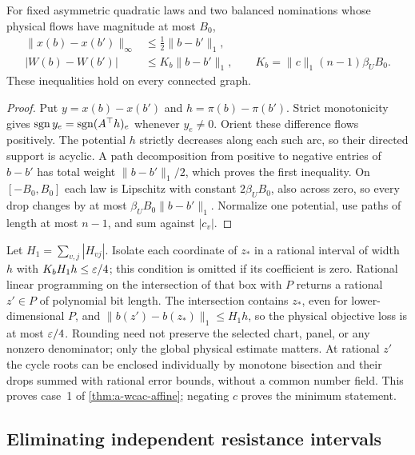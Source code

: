 \begin{lemma}
\label{lem:a-wcac-nomination-continuity}
For fixed asymmetric quadratic laws and two balanced nominations whose
physical flows have magnitude at most $B_0$,
\begin{align}
 \|x(b)-x(b')\|_\infty&\le\tfrac12\|b-b'\|_1,
 \label{eq:a-wcac-flow-nomination}\\
 |W(b)-W(b')|&\le K_b\|b-b'\|_1,
 \qquad K_b=\|c\|_1(n-1)\beta_U B_0.
 \label{eq:a-wcac-nomination-bound}
\end{align}
These inequalities hold on every connected graph.
\end{lemma}
\begin{proof}
Put $y=x(b)-x(b')$ and $h=\pi(b)-\pi(b')$. Strict monotonicity gives
$\operatorname{sgn} y_e=\operatorname{sgn}(A^\top h)_e$ whenever $y_e\ne0$. Orient these difference
flows positively. The potential $h$ strictly decreases along each such
arc, so their directed support is acyclic. A path decomposition from
positive to negative entries of $b-b'$ has total weight $\|b-b'\|_1/2$,
which proves the first inequality. On $[-B_0,B_0]$ each law is Lipschitz
with constant $2\beta_U B_0$, also across zero, so every drop changes by
at most $\beta_U B_0\|b-b'\|_1$. Normalize one potential, use paths of
length at most $n-1$, and sum against $|c_v|$.
\end{proof}

Let $H_1=\sum_{v,j}|H_{vj}|$. Isolate each coordinate of $z_*$ in a rational
interval of width $h$ with $K_bH_1h\le\varepsilon/4$; this condition is omitted
if its coefficient is zero. Rational linear programming on the
intersection of that box with $P$ returns a rational $z'\in P$ of
polynomial bit length. The intersection contains $z_*$, even for
lower-dimensional $P$, and $\|b(z')-b(z_*)\|_1\le H_1h$, so the physical
objective loss is at most $\varepsilon/4$. Rounding need not preserve the
selected chart, panel, or any nonzero denominator; only the global
physical estimate matters. At rational $z'$ the cycle roots can be
enclosed individually by monotone bisection and their drops summed with
rational error bounds, without a common number field. This proves case~1
of \cref{thm:a-wcac-affine}; negating $c$ proves the minimum statement.

\subsection{Eliminating independent resistance intervals}

